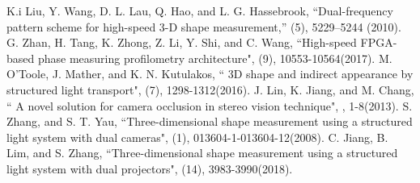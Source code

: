 \documentclass[10pt,letterpaper]{article}
\begin{document}
\begin{thebibliography}{99}
K.i Liu, Y. Wang, D. L. Lau, Q. Hao, and L. G. Hassebrook, ``Dual-frequency pattern scheme for high-speed 3-D shape measurement,'' (5), 5229--5244 (2010).
G. Zhan, H. Tang, K. Zhong, Z. Li, Y. Shi, and C. Wang, ``High-speed FPGA-based phase measuring profilometry architecture", (9), 10553-10564(2017).
M. O'Toole, J. Mather, and K. N. Kutulakos, `` 3D shape and indirect appearance by structured light transport", (7), 1298-1312(2016).
J. Lin, K. Jiang, and  M. Chang, `` A novel solution for camera occlusion in stereo vision technique", , 1-8(2013).
S. Zhang, and S. T. Yau, ``Three-dimensional shape measurement using a structured light system with dual cameras", (1), 013604-1-013604-12(2008).
C. Jiang, B. Lim, and S. Zhang, ``Three-dimensional shape measurement using a structured light system with dual projectors", (14), 3983-3990(2018).

\end{thebibliography} 


\end{document}
